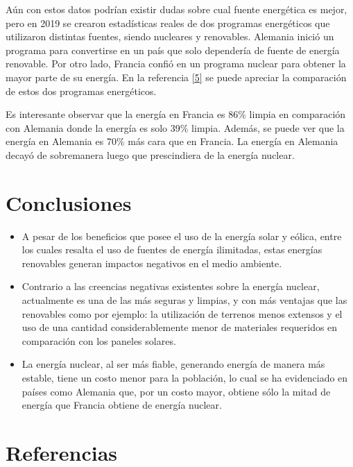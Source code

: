 \documentclass[12pt,spanish,Letterpaper,openany]{book}
\begin{document}
\hypertarget{articulo06_cross05}{}

Aún con estos datos podrían existir dudas sobre cual fuente energética es mejor, pero en 2019 se crearon estadísticas reales de dos programas energéticos que utilizaron distintas fuentes, siendo nucleares y renovables. Alemania inició un programa para convertirse en un país que solo dependería de fuente de energía renovable. Por otro lado, Francia confió en un programa nuclear para obtener la mayor parte de su energía. En la referencia \protect\hyperlink{articulo06_ref05}{{[}5{]}} se puede apreciar la comparación de estos dos programas energéticos.

Es interesante observar que la energía en Francia es 86\% limpia en comparación con Alemania donde la energía es solo 39\% limpia. Además, se puede ver que la energía en Alemania es 70\% más cara que en Francia. La energía en Alemania decayó de sobremanera luego que prescindiera de la energía nuclear.

\hypertarget{conclusiones-5}{%
\section*{Conclusiones}\label{conclusiones-5}}

\begin{itemize}
\item
  A pesar de los beneficios que posee el uso de la energía solar y eólica, entre los cuales resalta el uso de fuentes de energía ilimitadas, estas energías renovables generan impactos negativos en el medio ambiente.
\item
  Contrario a las creencias negativas existentes sobre la energía nuclear, actualmente es una de las más seguras y limpias, y con más ventajas que las renovables como por ejemplo: la utilización de terrenos menos extensos y el uso de una cantidad considerablemente menor de materiales requeridos en comparación con los paneles solares.
\item
  La energía nuclear, al ser más fiable, generando energía de manera más estable, tiene un costo menor para la población, lo cual se ha evidenciado en países como Alemania que, por un costo mayor, obtiene sólo la mitad de energía que Francia obtiene de energía nuclear.
\end{itemize}

\hypertarget{referencias-5}{%
\section*{Referencias}\label{referencias-5}}
\end{document}
